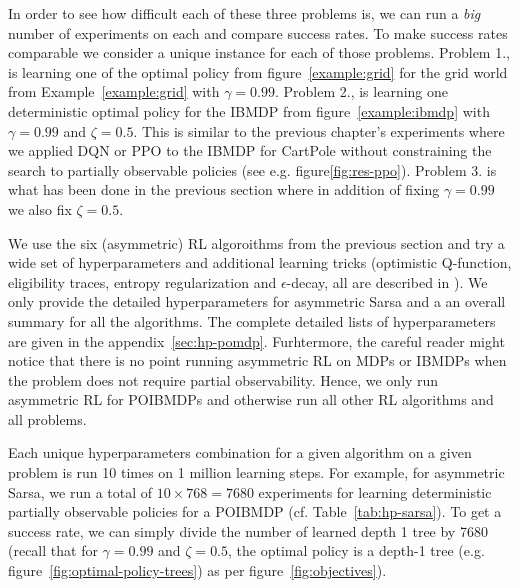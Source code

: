 In order to see how difficult each of these three problems is, we can run a \textit{big} number of experiments on each and compare success rates.
To make success rates comparable we consider a unique instance for each of those problems.
Problem 1., is learning one of the optimal policy from figure~\ref{example:grid} for the grid world from Example~\ref{example:grid} with $\gamma=0.99$.
Problem 2., is learning one deterministic optimal policy for the IBMDP from figure~\ref{example:ibmdp} with $\gamma=0.99$ and $\zeta=0.5$.
This is similar to the previous chapter's experiments where we applied DQN or PPO to the IBMDP for CartPole without constraining the search to partially observable policies (see e.g. figure\ref{fig:res-ppo}).
Problem 3. is what has been done in the previous section where in addition of fixing $\gamma=0.99$ we also fix $\zeta=0.5$.

We use the six (asymmetric) RL algoroithms from the previous section and try a wide set of hyperparameters and additional learning tricks (optimistic Q-function, eligibility traces, entropy regularization and $\epsilon$-decay, all are described in \cite{sutton}).
We only provide the detailed hyperparameters for asymmetric Sarsa and a an overall summary for all the algorithms.
The complete detailed lists of hyperparameters are given in the appendix~\ref{sec:hp-pomdp}.
Furhtermore, the careful reader might notice that there is no point running asymmetric RL on MDPs or IBMDPs when the problem does not require partial observability.
Hence, we only run asymmetric RL for POIBMDPs and otherwise run all other RL algorithms and all problems.

Each unique hyperparameters combination for a given algorithm on a given problem is run 10 times on 1 million learning steps.
For example, for asymmetric Sarsa, we run a total of $10\times 768= 7680$ experiments for learning deterministic partially observable policies for a POIBMDP (cf. Table~\ref{tab:hp-sarsa}).
To get a success rate, we can simply divide the number of learned depth 1 tree by 7680 (recall that for $\gamma=0.99$ and $\zeta=0.5$, the optimal policy is a depth-1 tree (e.g. figure~\ref{fig:optimal-policy-trees}) as per figure~\ref{fig:objectives}). 

